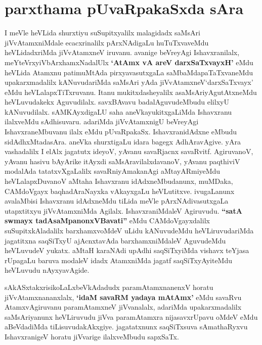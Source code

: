 \section*{parxthama pUvaRpakaSxda sAra}

\begin{artha}
I meVle heVLida shurxtiyu suSupitxyalilx malagidadx saMsAri
jiVvAtamxniMdale ecacxrinalilx pArxNAdigaLu huTuTxvaveMdu
heVLidadxriMda jiVvAtamxneV iruvanu. avanige beVreyAgi Ishavxranilalx,
meYteVrxyiVbArxhamxNadalUlx \textbf{`AtAmx vA areV darxSaTxvayxH'} eMdu heVLida
Atamxnu patimuMtAda pirxyavasutxgaLa saMbaMdapaTaTxvaneMdu
upakarxmadalilx kANuvudariMda saMsAri yAda jiVvAtamxneV`darxSaTxvayx'
eMdu heVLalapxTiTxruvanu. Itanu mukitxdasheyalilx
asaMsAriyAgutAtxneMdu heVLuvudakekx Aguvudilalx. savxBAvavu
badalAguvudeMbudu elilxyU kANuvudilalx. sAMKAyxdigaLU saha
aneVkayukitxgaLiMda Ishavxranu ilalxveMdu sAdhisuvaru. adariMda
jiVvAtamxnigU beVreyAgi IshavxraneMbuvanu ilalx eMdu
pUvaRpakaSx. IshavxranidAdxne eMbudu sidAdhxMtadasAra. aneVka shurxtigaLu
idara bagegx  AdhAravAgive. yAra vashadalilx I elAlx jagatutx ideyoV,
yAvanu savaRjacnx savaRvitf. AgiruvanoV, yAvanu hasivu  bAyArike
itAyxdi saMsAravilalxdavanoV, yAvanu paqthiviV modalAda
tatatxvXgaLalilx savaRniyAmakanAgi aMtayARmiyeMdu heVLalapxDuvanoV
aMtaha Ishavxranu idAdxneMbudanunx, muMDaka, CAMdoVgayx baqhadAraNayxka
vAkayxgaLu heVLutitxve. ivugaLanunx avalaMbisi Ishavxranu idAdxneMdu
tiLida meVle pArxNAdivasutxgaLa utapxtitxyu jiVvAtamxniMda
Agilalx. IshavxraniMdaleV Agiruvudu. \textbf{``satA
swmayx tadAsaMpanonxVBavati''} eMdu CAMdoVgayxdalilx suSupitxkAladalilx
barxhamxvoMdeV uLidu kANuvudeMdu heVLiruvudariMda jagatitxna saqSiTxyU
ajAcnxtavAda barxhamxniMdaleV AguvudeMdu heVLuvudeV yukatx. aMtaH
karaNAdi upAdhi saqSiTxyiMda vishavx teYjasa rUpagaLu baruva modaleV
idadx AtamxniMda jagatf saqSiTxyAyiteMdu heVLuvudu nAyxyavAgide.
\end{artha}


\begin{artha}
sAkASxtakxrisikoLaLxbeVkAdadudx paramAtamxnanenxV horatu
jiVvAtamxnananxlalx, \textbf{`idaM savaRM yadaya mAtAmx'} eMdu savaRvu
AtamxvAgiruvanu paramAtamxneV jiVvanalalx, adariMda upakarxmadalilx
saMsAriyanunx heVLiruvudu jiVva paramAtamxra nijasavxrUpavu oMdeV eMdu
aBeVdadiMda tiLisuvudakAkxgiye. jagatatxnunx saqSiTxsuva sAmathaRyxvu
IshavxranigeV horatu jiVvarige ilalxveMbudu sapxSaTx.
\end{artha}



